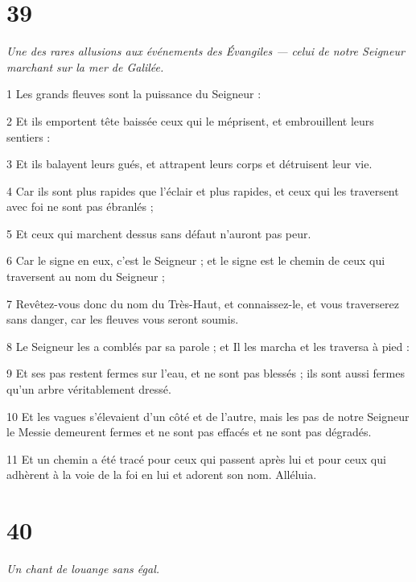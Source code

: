 \chapter{39}

\par \textit{Une des rares allusions aux événements des Évangiles — celui de notre Seigneur marchant sur la mer de Galilée.}

\par 1 Les grands fleuves sont la puissance du Seigneur :
\par 2 Et ils emportent tête baissée ceux qui le méprisent, et embrouillent leurs sentiers :
\par 3 Et ils balayent leurs gués, et attrapent leurs corps et détruisent leur vie.
\par 4 Car ils sont plus rapides que l'éclair et plus rapides, et ceux qui les traversent avec foi ne sont pas ébranlés ;
\par 5 Et ceux qui marchent dessus sans défaut n'auront pas peur.
\par 6 Car le signe en eux, c'est le Seigneur ; et le signe est le chemin de ceux qui traversent au nom du Seigneur ;
\par 7 Revêtez-vous donc du nom du Très-Haut, et connaissez-le, et vous traverserez sans danger, car les fleuves vous seront soumis.
\par 8 Le Seigneur les a comblés par sa parole ; et Il les marcha et les traversa à pied :
\par 9 Et ses pas restent fermes sur l'eau, et ne sont pas blessés ; ils sont aussi fermes qu’un arbre véritablement dressé.
\par 10 Et les vagues s'élevaient d'un côté et de l'autre, mais les pas de notre Seigneur le Messie demeurent fermes et ne sont pas effacés et ne sont pas dégradés.
\par 11 Et un chemin a été tracé pour ceux qui passent après lui et pour ceux qui adhèrent à la voie de la foi en lui et adorent son nom. Alléluia.

\chapter{40}

\par \textit{Un chant de louange sans égal.}

